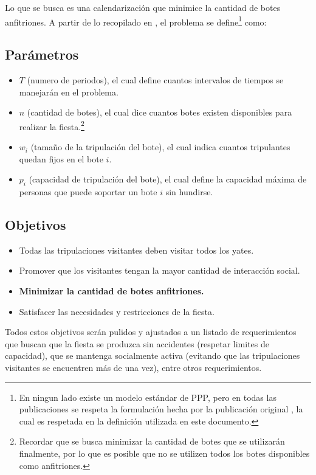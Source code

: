 \documentclass[letter, 10pt]{article}
\begin{document}
Lo que se busca es una calendarización que minimice la cantidad de botes anfitriones. A partir de lo recopilado en \cite{FirstPublication,PPPAsMIP,WalserThesis,LocalSearch}, el problema se define\footnote{En ningun lado existe un modelo estándar de PPP, pero en todas las publicaciones se respeta la formulación hecha por la publicación original \cite{FirstPublication}, la cual es respetada en la definición utilizada en este documento.} como: \\

\subsection{Parámetros}
\begin{itemize}
\item $T$ (numero de periodos), el cual define cuantos intervalos de tiempos se manejarán en el problema.
\item $n$ (cantidad de botes), el cual dice cuantos botes existen disponibles para realizar la fiesta.\footnote{Recordar que se busca minimizar la cantidad de botes que se utilizarán finalmente, por lo que es posible que no se utilizen todos los botes disponibles como anfitriones.}
\item $w_i$ (tamaño de la tripulación del bote), el cual indica cuantos tripulantes quedan fijos en el bote $i$.
\item $p_i$ (capacidad de tripulación del bote), el cual define la capacidad máxima de personas que puede soportar un bote $i$ sin hundirse.
\end{itemize}

\subsection{Objetivos}
\begin{itemize}
\item Todas las tripulaciones visitantes deben visitar todos los yates.
\item Promover que los visitantes tengan la mayor cantidad de interacción social.
\item \textbf{Minimizar la cantidad de botes anfitriones.}
\item Satisfacer las necesidades y restricciones de la fiesta.
\end{itemize}

Todos estos objetivos serán pulidos y ajustados a un listado de requerimientos
que buscan que la fiesta se produzca sin accidentes (respetar limites de capacidad), que se mantenga socialmente activa (evitando que las tripulaciones visitantes se encuentren más de una vez), entre otros requerimientos.
\end{document}
